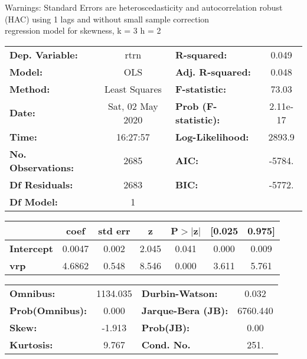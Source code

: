 Warnings: \newline
 [1] Standard Errors are heteroscedasticity and autocorrelation robust (HAC) using 1 lags and without small sample correction\\ 

regression model for skewness, k = 3 h = 2\begin{center}
\begin{tabular}{lclc}
\toprule
\textbf{Dep. Variable:}    &       rtrn       & \textbf{  R-squared:         } &     0.049   \\
\textbf{Model:}            &       OLS        & \textbf{  Adj. R-squared:    } &     0.048   \\
\textbf{Method:}           &  Least Squares   & \textbf{  F-statistic:       } &     73.03   \\
\textbf{Date:}             & Sat, 02 May 2020 & \textbf{  Prob (F-statistic):} &  2.11e-17   \\
\textbf{Time:}             &     16:27:57     & \textbf{  Log-Likelihood:    } &    2893.9   \\
\textbf{No. Observations:} &        2685      & \textbf{  AIC:               } &    -5784.   \\
\textbf{Df Residuals:}     &        2683      & \textbf{  BIC:               } &    -5772.   \\
\textbf{Df Model:}         &           1      & \textbf{                     } &             \\
\bottomrule
\end{tabular}
\begin{tabular}{lcccccc}
                   & \textbf{coef} & \textbf{std err} & \textbf{z} & \textbf{P$> |$z$|$} & \textbf{[0.025} & \textbf{0.975]}  \\
\midrule
\textbf{Intercept} &       0.0047  &        0.002     &     2.045  &         0.041        &        0.000    &        0.009     \\
\textbf{vrp}       &       4.6862  &        0.548     &     8.546  &         0.000        &        3.611    &        5.761     \\
\bottomrule
\end{tabular}
\begin{tabular}{lclc}
\textbf{Omnibus:}       & 1134.035 & \textbf{  Durbin-Watson:     } &    0.032  \\
\textbf{Prob(Omnibus):} &   0.000  & \textbf{  Jarque-Bera (JB):  } & 6760.440  \\
\textbf{Skew:}          &  -1.913  & \textbf{  Prob(JB):          } &     0.00  \\
\textbf{Kurtosis:}      &   9.767  & \textbf{  Cond. No.          } &     251.  \\
\bottomrule
\end{tabular}
\end{center}

